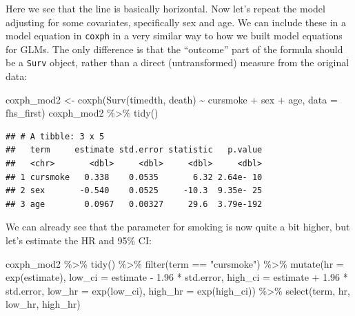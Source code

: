 \documentclass[
]{book}
\newenvironment{Shaded}{\begin{snugshade}}{\end{snugshade}}
\newcommand{\AttributeTok}[1]{\textcolor[rgb]{0.77,0.63,0.00}{#1}}
\newcommand{\FloatTok}[1]{\textcolor[rgb]{0.00,0.00,0.81}{#1}}
\newcommand{\FunctionTok}[1]{\textcolor[rgb]{0.00,0.00,0.00}{#1}}
\newcommand{\NormalTok}[1]{#1}
\newcommand{\OtherTok}[1]{\textcolor[rgb]{0.56,0.35,0.01}{#1}}
\newcommand{\SpecialCharTok}[1]{\textcolor[rgb]{0.00,0.00,0.00}{#1}}
\newcommand{\StringTok}[1]{\textcolor[rgb]{0.31,0.60,0.02}{#1}}
\begin{document}
Here we see that the line is basically horizontal. Now let's repeat the model adjusting for some covariates, specifically sex and age. We can include these in a model equation in \texttt{coxph} in a very similar way to how we built model equations for GLMs. The only difference is that the ``outcome'' part of the formula should be a \texttt{Surv} object, rather than a direct (untransformed) measure from the original data:

\begin{Shaded}
\begin{Highlighting}[]
\NormalTok{coxph\_mod2 }\OtherTok{\textless{}{-}} \FunctionTok{coxph}\NormalTok{(}\FunctionTok{Surv}\NormalTok{(timedth, death) }\SpecialCharTok{\textasciitilde{}}\NormalTok{ cursmoke }\SpecialCharTok{+}\NormalTok{ sex }\SpecialCharTok{+}\NormalTok{ age, }
                    \AttributeTok{data =}\NormalTok{ fhs\_first)}
\NormalTok{coxph\_mod2 }\SpecialCharTok{\%\textgreater{}\%}
  \FunctionTok{tidy}\NormalTok{()}
\end{Highlighting}
\end{Shaded}

\begin{verbatim}
## # A tibble: 3 x 5
##   term     estimate std.error statistic   p.value
##   <chr>       <dbl>     <dbl>     <dbl>     <dbl>
## 1 cursmoke   0.338    0.0535       6.32 2.64e- 10
## 2 sex       -0.540    0.0525     -10.3  9.35e- 25
## 3 age        0.0967   0.00327     29.6  3.79e-192
\end{verbatim}

We can already see that the parameter for smoking is now quite a bit higher, but let's estimate the HR and 95\% CI:

\begin{Shaded}
\begin{Highlighting}[]
\NormalTok{coxph\_mod2 }\SpecialCharTok{\%\textgreater{}\%} 
  \FunctionTok{tidy}\NormalTok{() }\SpecialCharTok{\%\textgreater{}\%} 
  \FunctionTok{filter}\NormalTok{(term }\SpecialCharTok{==} \StringTok{"cursmoke"}\NormalTok{) }\SpecialCharTok{\%\textgreater{}\%} 
  \FunctionTok{mutate}\NormalTok{(}\AttributeTok{hr =} \FunctionTok{exp}\NormalTok{(estimate),}
         \AttributeTok{low\_ci =}\NormalTok{ estimate }\SpecialCharTok{{-}} \FloatTok{1.96} \SpecialCharTok{*}\NormalTok{ std.error, }
         \AttributeTok{high\_ci =}\NormalTok{ estimate }\SpecialCharTok{+} \FloatTok{1.96} \SpecialCharTok{*}\NormalTok{ std.error, }
         \AttributeTok{low\_hr =} \FunctionTok{exp}\NormalTok{(low\_ci), }
         \AttributeTok{high\_hr =} \FunctionTok{exp}\NormalTok{(high\_ci)) }\SpecialCharTok{\%\textgreater{}\%} 
  \FunctionTok{select}\NormalTok{(term, hr, low\_hr, high\_hr)}
\end{Highlighting}
\end{Shaded}
\end{document}

